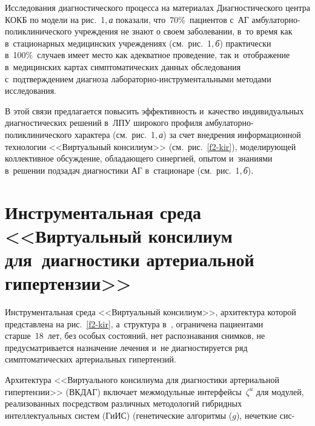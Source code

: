 \begin{multicols}{2}
  

  Исследования диагностического процесса на материалах Диагностического центра КОКБ 
по модели на рис.~1,\,\textit{а} показали, что~70\%~пациентов с~АГ 
амбулаторно-поликлинического учреждения не знают о своем заболевании, в~то время как в~стационарных 
медицинских учреждениях (см.\ рис.~1,\,\textit{б}) практически в~100\%~случаев имеет место 
как адекватное проведение, так и~отображение в~медицинских картах симптоматических 
данных обследования с~подтверждением диагноза  
ла\-бо\-ра\-тор\-но-ин\-ст\-ру\-мен\-таль\-ны\-ми методами исследования. 
  
  В этой связи предлагается повысить эффективность и~качество индивидуальных 
диагностических решений в~ЛПУ широкого профиля амбула\-тор\-но-по\-ли\-кли\-ни\-че\-ско\-го 
характера (см.\ рис.~1,\,\textit{а}) за счет внед\-ре\-ния информационной технологии 
<<Виртуальный консилиум>> (см.\ рис.~\ref{f2-kir}), моделирующей коллективное обсуждение, 
обладающего синергией, опытом и~знаниями в~решении подзадач диагностики 
АГ в~стационаре (см.\ рис.~1,\,\textit{б}). 


  

  
\section{Инструментальная среда <<Виртуальный консилиум для~диагностики 
артериальной гипертензии>>}

\vspace*{-18pt}

  Инструментальная среда <<Виртуальный консилиум>>, архитектура которой 
представлена на рис.~\ref{f2-kir}, а~структура в~\cite{7-kir}, ограничена пациентами 
стар\-ше~18~лет, без особых состояний, нет распознавания снимков, не предусматривается 
назначение лечения и~не диагностируется ряд симптоматических артериальных гипертензий. 

Архитектура <<Виртуального консилиума для диагностики артериальной гипертензии>> 
(ВКДАГ) включает межмодульные интерфейсы~$\zeta^u$ для модулей, реализованных 
посредством различных методологий гибридных интеллектуальных сис\-тем (\mbox{ГиИС}) 
(генетические алгоритмы ($g$), нечеткие 
сис-\linebreak\vspace*{-12pt}

\pagebreak

\end{multicols}

